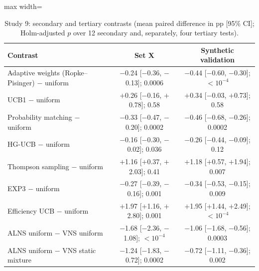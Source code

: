 \begin{table}[t]
\caption{Study 9: secondary and tertiary contrasts (mean paired difference in pp [95\% CI]; Holm-adjusted $p$ over 12 secondary and, separately, four tertiary tests).}\label{tab:s9tests}
\centering
\small
\begin{adjustbox}{max width=\linewidth}
\begin{tabular}{lcc}
\toprule
Contrast & Set X & Synthetic validation \\
\midrule
Adaptive weights (Ropke--Pisinger) $-$ uniform & $-$0.24 [$-$0.36, $-$0.13]; 0.0006 & $-$0.44 [$-$0.60, $-$0.30]; \ensuremath{<10^{-4}} \\
UCB1 $-$ uniform & $+$0.26 [$-$0.16, $+$0.78]; 0.58 & $+$0.34 [$-$0.03, $+$0.73]; 0.58 \\
Probability matching $-$ uniform & $-$0.33 [$-$0.47, $-$0.20]; 0.0002 & $-$0.46 [$-$0.68, $-$0.26]; 0.0002 \\
HG-UCB $-$ uniform & $-$0.16 [$-$0.30, $-$0.02]; 0.036 & $-$0.26 [$-$0.44, $-$0.09]; 0.12 \\
Thompson sampling $-$ uniform & $+$1.16 [$+$0.37, $+$2.03]; 0.41 & $+$1.18 [$+$0.57, $+$1.94]; 0.007 \\
EXP3 $-$ uniform & $-$0.27 [$-$0.39, $-$0.16]; 0.001 & $-$0.34 [$-$0.53, $-$0.15]; 0.009 \\
Efficiency UCB $-$ uniform & $+$1.97 [$+$1.16, $+$2.80]; 0.001 & $+$1.95 [$+$1.44, $+$2.49]; \ensuremath{<10^{-4}} \\
\addlinespace
ALNS uniform $-$ VNS uniform & $-$1.68 [$-$2.36, $-$1.08]; \ensuremath{<10^{-4}} & $-$1.06 [$-$1.68, $-$0.56]; 0.0003 \\
ALNS uniform $-$ VNS static mixture & $-$1.24 [$-$1.83, $-$0.72]; 0.0002 & $-$0.72 [$-$1.11, $-$0.36]; 0.002 \\
\bottomrule
\end{tabular}
\end{adjustbox}
\end{table}
